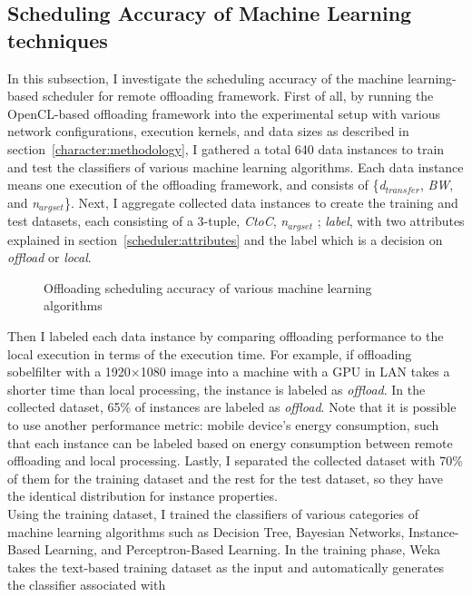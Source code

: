 \subsection{Scheduling Accuracy of Machine Learning techniques}
\label{scheduler:accuracy}
%
In this subsection, I investigate the scheduling accuracy of the machine
learning-based scheduler for remote offloading framework.
%
First of all, by running the OpenCL-based offloading framework into the
experimental setup with various network configurations, execution
kernels, and data sizes as described in
section~\ref{character:methodology}, I gathered a total 640 data
instances to train and test the classifiers of various machine learning
algorithms.
%
Each data instance means one execution of the offloading framework, and
consists of \{{\it d$_{transfer}$}, {\it BW}, and {\it n$_{argset}$}\}.
%
Next, I aggregate collected data instances to create the training and
test datasets, each consisting of a 3-tuple, {{\it CtoC}, {\it
n$_{argset}$} ; {\it label}}, with two attributes explained in
section~\ref{scheduler:attributes} and the label which is a decision on
{\it offload} or {\it local}.
%
\begin{figure}
\centering
{}
\caption{Offloading scheduling accuracy of various machine learning
algorithms}
\label{fig:scheduling_accuracy}
\end{figure}
%
Then I labeled each data instance by comparing offloading 
performance to the local execution in terms of the execution time.
%
For example, if offloading sobelfilter with a 1920$\times$1080 image
into a machine with a GPU in LAN takes a shorter time than
local processing, the instance is labeled as \textit{offload}.
%
In the collected dataset, 65\% of instances are labeled as
\textit{offload}.
%
Note that it is possible to use another performance metric: mobile
device's energy consumption, such that each instance can be labeled
based on energy consumption between remote offloading and local
processing.
%
Lastly, I separated the collected dataset with 70\% of them for
the training dataset and the rest for the test dataset, so they have
the identical distribution for instance properties.\\
%
Using the training dataset, I trained the classifiers of various
categories of machine learning algorithms such as Decision Tree,
Bayesian Networks, Instance-Based Learning, and Perceptron-Based
Learning. 
%
In the training phase, Weka takes the text-based training dataset as
the input and automatically generates the classifier associated with
